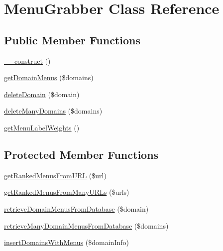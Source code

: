 \hypertarget{classMenuGrabber}{\section{Menu\-Grabber Class Reference}
\label{classMenuGrabber}
}
\subsection*{Public Member Functions}
\begin{DoxyCompactItemize}
\item 
\hyperlink{classMenuGrabber_ac95c640a95578eae70e354372f706528}{\-\_\-\-\_\-construct} ()
\item 
\hyperlink{classMenuGrabber_a82affc87b1f73fcf57f0dd6a0be20bdb}{get\-Domain\-Menus} (\$domains)
\item 
\hyperlink{classMenuGrabber_aacc8b06427fda409f2385d5ff189509a}{delete\-Domain} (\$domain)
\item 
\hyperlink{classMenuGrabber_a90913d8567536c5e277d6dad66b306bf}{delete\-Many\-Domains} (\$domains)
\item 
\hyperlink{classMenuGrabber_a55274935e94d4e811f592a28ee62da9a}{get\-Menu\-Label\-Weights} ()
\end{DoxyCompactItemize}
\subsection*{Protected Member Functions}
\begin{DoxyCompactItemize}
\item 
\hyperlink{classMenuGrabber_a837c936f2e2df191018092e2745dd5f9}{get\-Ranked\-Menus\-From\-U\-R\-L} (\$url)
\item 
\hyperlink{classMenuGrabber_a44023dd73d16f03c6a15bf1d6228491f}{get\-Ranked\-Menus\-From\-Many\-U\-R\-Ls} (\$urls)
\item 
\hyperlink{classMenuGrabber_acbbe3d83251aa6f0f5c1d5a073818f4a}{retrieve\-Domain\-Menus\-From\-Database} (\$domain)
\item 
\hyperlink{classMenuGrabber_a0fa3d0bdd671df3fe2b3c18907a7a1a1}{retrieve\-Many\-Domain\-Menus\-From\-Database} (\$domains)
\item 
\hyperlink{classMenuGrabber_a0b613eb7bef68287d68b2eff4867071e}{insert\-Domains\-With\-Menus} (\$domain\-Info)
\end{DoxyCompactItemize}


